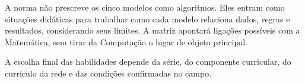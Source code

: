 A norma não prescreve os cinco modelos como algoritmos. Eles entram como situações didáticas para trabalhar como cada modelo relaciona dados, regras e resultados, considerando seus limites. A matriz apontará ligações possíveis com a Matemática, sem tirar da Computação o lugar de objeto principal.

A escolha final das habilidades depende da série, do componente curricular, do currículo da rede e das condições confirmadas no campo.
